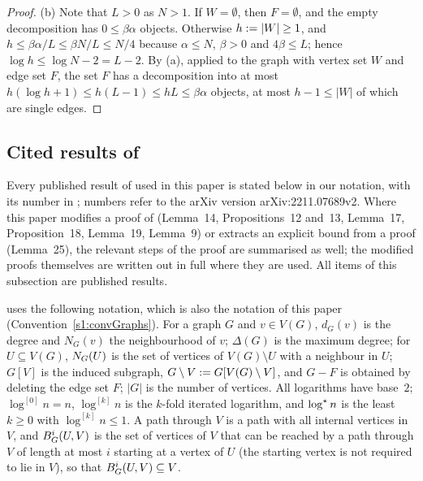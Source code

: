 \begin{proof}
(b) Note that $L>0$ as $N>1$. If $W=\emptyset$, then $F=\emptyset$, and the
empty decomposition has $0\le\beta\alpha$ objects. Otherwise $h\mathrel{:=}|W|\ge1$,
and $h\le\beta\alpha/L\le\beta N/L\le N/4$ because $\alpha\le N$, $\beta>0$ and
$4\beta\le L$; hence $\log h\le\log N-2=L-2$. By (a), applied to the graph with
vertex set $W$ and edge set $F$, the set $F$ has a decomposition into at most
$h(\log h+1)\le h(L-1)\le hL\le\beta\alpha$ objects, at most $h-1\le|W|$ of
which are single edges.
\end{proof}

\subsection{Cited results of \BMnames{}}\label{s1:ssecCited}

Every published result of \cite{BM} used in this paper is stated below in our
notation, with its number in \cite{BM}; numbers refer to the arXiv version
arXiv:2211.07689v2. Where this paper modifies a proof of \cite{BM}
(Lemma~14, Propositions~12 and~13, Lemma~17, Proposition~18, Lemma~19, Lemma~9)
or extracts an explicit bound from a proof (Lemma~25), the relevant steps of the
proof are summarised as well; the modified proofs themselves are written out in
full where they are used. All items of this subsection are published results.

\begin{citedresult}\label{s1:citNotation}
\cite{BM} uses the following notation, which is also the notation of this
paper (Convention~\ref{s1:convGraphs}). For a graph $G$ and $v\in V(G)$,
$d_G(v)$ is the degree and $N_G(v)$ the neighbourhood of $v$; $\Delta(G)$ is the
maximum degree; for $U\subseteq V(G)$, $N_G(U)$ is the set of vertices of
$V(G)\setminus U$ with a neighbour in $U$; $G[V]$ is the induced subgraph,
$G\setminus V\mathrel{:=} G[V(G)\setminus V]$, and $G-F$ is obtained by deleting the
edge set $F$; $|G|$ is the number of vertices. All logarithms have base~$2$;
$\log^{[0]}n=n$, $\log^{[k]}n$ is the $k$-fold iterated logarithm, and $\log^{\star} n$
is the least $k\ge0$ with $\log^{[k]}n\le1$. A path through $V$ is a path with
all internal vertices in $V$, and $B^{i}_{G}(U,V)$ is the set of vertices of
$V$ that can be reached by a path through $V$ of length at most $i$ starting at a
vertex of $U$ (the starting vertex is not required to lie in $V$), so that
$B^{i}_{G}(U,V)\subseteq V$.
\end{citedresult}

